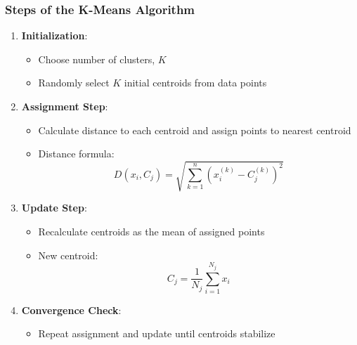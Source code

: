\documentclass{beamer}
\begin{document}
\begin{frame}[fragile]
    \frametitle{Steps of the K-Means Algorithm}
    \begin{enumerate}
        \item \textbf{Initialization}:
            \begin{itemize}
                \item Choose number of clusters, \(K\)
                \item Randomly select \(K\) initial centroids from data points
            \end{itemize}
        
        \item \textbf{Assignment Step}:
            \begin{itemize}
                \item Calculate distance to each centroid and assign points to nearest centroid
                \item Distance formula:
                  \begin{equation}
                    D(x_i, C_j) = \sqrt{\sum_{k=1}^{n}(x_i^{(k)} - C_j^{(k)})^2}
                  \end{equation}
            \end{itemize}
        
        \item \textbf{Update Step}:
            \begin{itemize}
                \item Recalculate centroids as the mean of assigned points
                \item New centroid:
                  \begin{equation}
                    C_j = \frac{1}{N_j} \sum_{i=1}^{N_j} x_i
                  \end{equation}
            \end{itemize}
        
        \item \textbf{Convergence Check}:
            \begin{itemize}
                \item Repeat assignment and update until centroids stabilize
            \end{itemize}
    \end{enumerate}
\end{frame}
\end{document}
